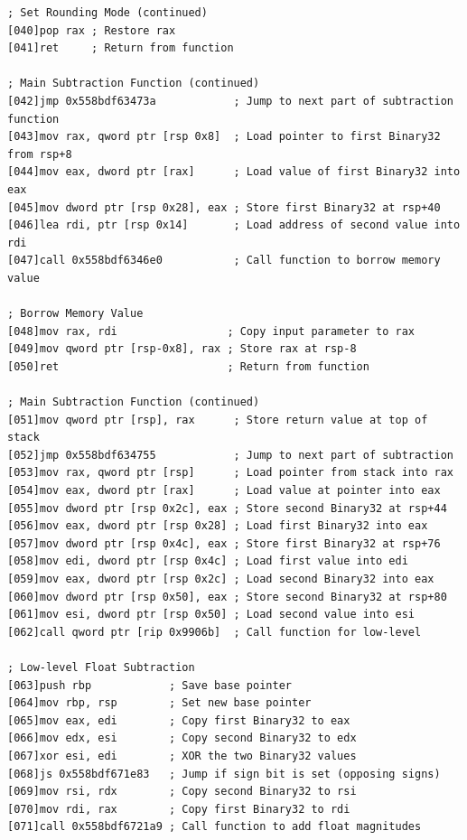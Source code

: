 \documentclass[12pt,letter]{article}
\begin{document}
\begin{lstlisting}[style=rust, caption={Annotated IEE-754 Binary32 Normal Subtraction ASM Trace}, label={fig:ieee_subtract}]
; Set Rounding Mode (continued)
[040]pop rax ; Restore rax
[041]ret     ; Return from function

; Main Subtraction Function (continued)
[042]jmp 0x558bdf63473a            ; Jump to next part of subtraction function
[043]mov rax, qword ptr [rsp 0x8]  ; Load pointer to first Binary32 from rsp+8
[044]mov eax, dword ptr [rax]      ; Load value of first Binary32 into eax
[045]mov dword ptr [rsp 0x28], eax ; Store first Binary32 at rsp+40
[046]lea rdi, ptr [rsp 0x14]       ; Load address of second value into rdi
[047]call 0x558bdf6346e0           ; Call function to borrow memory value

; Borrow Memory Value
[048]mov rax, rdi                 ; Copy input parameter to rax
[049]mov qword ptr [rsp-0x8], rax ; Store rax at rsp-8
[050]ret                          ; Return from function

; Main Subtraction Function (continued)
[051]mov qword ptr [rsp], rax      ; Store return value at top of stack
[052]jmp 0x558bdf634755            ; Jump to next part of subtraction
[053]mov rax, qword ptr [rsp]      ; Load pointer from stack into rax
[054]mov eax, dword ptr [rax]      ; Load value at pointer into eax
[055]mov dword ptr [rsp 0x2c], eax ; Store second Binary32 at rsp+44
[056]mov eax, dword ptr [rsp 0x28] ; Load first Binary32 into eax
[057]mov dword ptr [rsp 0x4c], eax ; Store first Binary32 at rsp+76
[058]mov edi, dword ptr [rsp 0x4c] ; Load first value into edi
[059]mov eax, dword ptr [rsp 0x2c] ; Load second Binary32 into eax
[060]mov dword ptr [rsp 0x50], eax ; Store second Binary32 at rsp+80
[061]mov esi, dword ptr [rsp 0x50] ; Load second value into esi
[062]call qword ptr [rip 0x9906b]  ; Call function for low-level

; Low-level Float Subtraction
[063]push rbp            ; Save base pointer
[064]mov rbp, rsp        ; Set new base pointer
[065]mov eax, edi        ; Copy first Binary32 to eax
[066]mov edx, esi        ; Copy second Binary32 to edx
[067]xor esi, edi        ; XOR the two Binary32 values
[068]js 0x558bdf671e83   ; Jump if sign bit is set (opposing signs)
[069]mov rsi, rdx        ; Copy second Binary32 to rsi
[070]mov rdi, rax        ; Copy first Binary32 to rdi
[071]call 0x558bdf6721a9 ; Call function to add float magnitudes


\end{lstlisting}
\end{document}
